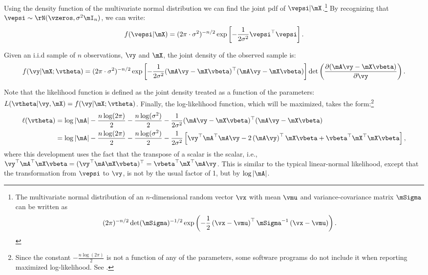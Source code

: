 \documentclass[english,12pt]{book}\usepackage[]{graphicx}\usepackage[]{xcolor}
\begin{document}
Using the density function of the multivariate normal distribution we can find the joint pdf of $\vepsi|\mX$.\footnote{The multivariate normal distribution of an $n$-dimensional random vector $\vx$ with mean $\vmu$ and variance-covariance matrix $\mSigma$ can be written as 
\begin{equation*}
(2\pi)^{-n/2}\det(\mSigma)^{-1/2}\exp\left(-\frac{1}{2}\left(\vx - \vmu\right)^\top\mSigma^{-1}\left(\vx - \vmu\right)\right).
\end{equation*}
} By recognizing that $\vepsi \sim \rN(\vzeros, \sigma^2\mI_n)$, we can write: 
\begin{equation*}
	f(\vepsi | \mX) = (2\pi \cdot\sigma^2)^{-n/2}\exp\left[-\frac{1}{2\sigma^2}\vepsi^\top\vepsi\right].
\end{equation*}

Given an i.i.d sample of $n$ observations, $\vy$ and $\mX$, the joint density of the observed sample is:
\begin{equation*}
	f(\vy|\mX;\vtheta) = (2\pi \cdot\sigma^2)^{-n/2}\exp\left[-\frac{1}{2\sigma^2}(\mA\vy-\mX\vbeta)^\top (\mA\vy-\mX\vbeta)\right]\det\left(\frac{\partial (\mA\vy - \mX\vbeta)}{\partial \vy}\right).
	\end{equation*}
	
Note that the likelihood function is defined as the joint density treated as a function of the parameters: $L(\vtheta|\vy, \mX) = f(\vy|\mX;\vtheta)$. Finally, the log-likelihood function, which will be maximized, takes the form:\footnote{Since the constant $- \frac{n\log(2\pi)}{2}$ is not a function of any of the parameters, some software programs do not include it when reporting maximized log-likelihood. See \cite{spdep}.}
\begin{equation} \label{eq:LL_SLM_2}
  \begin{aligned}
\ell (\vtheta) &= \log\left| \mA\right| - \frac{n\log(2\pi)}{2} - \frac{n\log(\sigma^2)}{2} - \frac{1}{2\sigma^2}(\mA\vy-\mX\vbeta)^\top (\mA\vy-\mX\vbeta) \\
&= \log\left| \mA\right| - \frac{n\log(2\pi)}{2} - \frac{n\log(\sigma^2)}{2} - \frac{1}{2\sigma^2}\left[\vy^\top \mA^\top\mA\vy - 2\left(\mA\vy\right)^\top\mX\vbeta + \vbeta^\top\mX^\top\mX\vbeta\right],
\end{aligned}
\end{equation}	
%	
where this development uses the fact that the transpose of a scalar is the scalar, i.e., 	$\vy^\top\mA^\top\mX\vbeta = (\vy^\top\mA\mX\vbeta)^\top = \vbeta^\top\mX^\top\mA\vy$. This is similar to the typical linear-normal likelihood, except that the transformation from $\vepsi$ to $\vy$, is not by the usual factor of 1, but by $\log\left| \mA\right|$.
\end{document}
